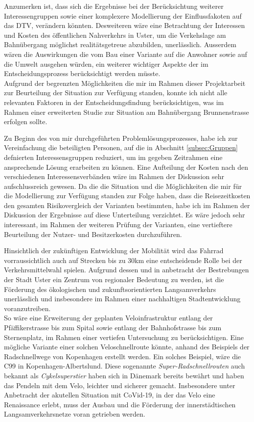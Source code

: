 Anzumerken ist, dass sich die Ergebnisse bei der Berücksichtung weiterer Interessengruppen sowie einer komplexere Modellierung der Einflussfakoten auf das DTV, verändern könnten.
Desweiteren wäre eine Betrachtung der Interessen und Kosten des öffentlichen Nahverkehrs in Uster, um die Verkehslage am Bahnübergang möglichst realitätsgetreue abzubilden, unerlässlich. Ausserdem wären die Auswirkungen die vom Bau einer Variante auf die Anwohner sowie auf die Umwelt ausgehen würden, ein weiterer wichtiger Aspekte der im Entscheidungsprozess berücksichtigt werden müsste.  \\
Aufgrund der begrenzten Möglichkeiten die mir im Rahmen dieser Projektarbeit zur Beurteilung der Situation zur Verfügung standen, konnte ich nicht alle relevanten Faktoren in der Entscheidungsfindung berücksichtigen, was im Rahmen einer erweiterten Studie zur Situation am Bahnübergang Brunnenstrasse erfolgen sollte.

Zu Beginn des von mir durchgeführten Problemlösungsprozesses, habe ich zur Vereinfachung die beteiligten Personen, auf die in Abschnitt \ref{subsec:Gruppen} defnierten Interessensgruppen reduziert, um im gegeben Zeitrahmen eine ansprechende Lösung erarbeiten zu können. 
Eine Aufteilung der Kosten nach den verschiedenen Interessensverbänden wäre im Rahmen der Diskussion sehr aufschlussreich gewesen. Da die die Situation und die Möglichkeiten die mir für die Modellierung zur Verfügung standen zur Folge haben, dass die Reisezeitkosten den gesamten Risikovergleich der Varianten bestimmten, habe ich im Rahmen der Diskussion der Ergebnisse auf diese Unterteilung verzichtet. Es wäre jedoch sehr interessant, im Rahmen der weiteren Prüfung der Varianten, eine vertieftere Beurteilung der Nutzer- und Besitzerkosten durchzuführen.

Hinsichtlich der zukünftigen Entwicklung der Mobilität wird das Fahrrad vorraussichtlich auch auf Strecken bis zu 30km eine entscheidende Rolle bei der Verkehrsmittelwahl spielen. Aufgrund dessen und in anbetracht der Bestrebungen der Stadt Uster ein Zentrum von regionaler Bedeutung zu werden, ist die Förderung des ökologischen und zukunftsorientierten Langsamverkehrs unerlässlich und insbesondere im Rahmen einer nachhaltigen Stadtentwicklung voranzutreiben. \\
So wäre eine Erweiterung der geplanten Veloinfrastruktur entlang der Pfäffikerstrasse bis zum Spital sowie entlang der Bahnhofstrasse bis zum Sternenplatz, im Rahmen einer vertiefen Untersuchung zu berücksichtigen. Eine mögliche Variante einer solchen Veloschnellroute könnte, anhand des Beispiels der Radschnellwege von Kopenhagen erstellt werden. Ein solches Beispiel, wäre die C99 in Kopenhagen-Albertslund. Diese sogenannte \textit{Super-Radschnellrouten} auch bekannt als \textit{Cykelsuperstier} haben sich in Dänemark bereits bewährt und haben das Pendeln mit dem Velo, leichter und sicherer gemacht.  
Insbesondere unter Anbetracht der akutellen Situation mit CoVid-19, in der das Velo eine Renaissance erlebt, muss der Ausbau und die Förderung der innerstädtischen Langsamverkehrsnetze voran getrieben werden.


